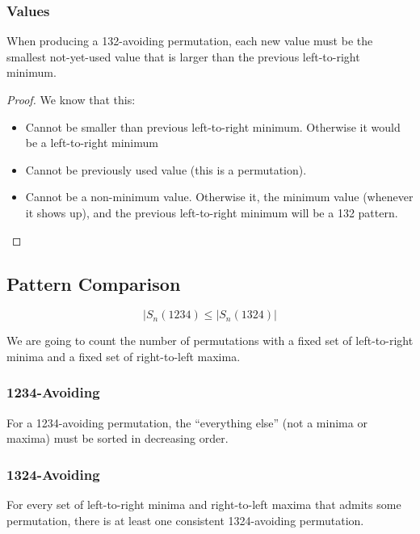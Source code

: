 \documentclass[letterpaper]{article}
\begin{document}
\subsubsection{Values}
\begin{lemma}{}{}
    When producing a 132-avoiding permutation, each new value must be the smallest not-yet-used value that is larger than the previous left-to-right minimum.
\end{lemma}

\begin{proof}
    We know that this:
    \begin{itemize}
        \item Cannot be smaller than previous left-to-right minimum. Otherwise it would be a left-to-right minimum
        \item Cannot be previously used value (this is a permutation). 
        \item Cannot be a non-minimum value. Otherwise it, the minimum value (whenever it shows up), and the previous left-to-right minimum will be a 132 pattern. \qedhere
    \end{itemize}
\end{proof}

\subsection{Pattern Comparison}
\begin{theorem}{}{}
    \[|S_{n}(1234) \leq |S_{n}(1324)|\]
\end{theorem}
We are going to count the number of permutations with a fixed set of left-to-right minima and a fixed set of right-to-left maxima. 

\subsubsection{1234-Avoiding}
\begin{lemma}{}{}
    For a 1234-avoiding permutation, the ``everything else'' (not a minima or maxima) must be sorted in decreasing order.
\end{lemma}

\subsubsection{1324-Avoiding}
\begin{lemma}{}{}
    For every set of left-to-right minima and right-to-left maxima that admits some permutation, there is at least one consistent 1324-avoiding permutation. 
\end{lemma}
\end{document}
